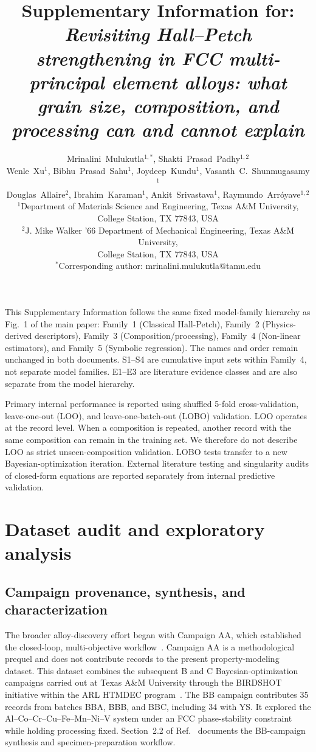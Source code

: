 \documentclass[a4paper,11pt]{article}
\title{Supplementary Information for:\\
\emph{Revisiting Hall--Petch strengthening in FCC multi-principal element alloys: what grain size, composition, and processing can and cannot explain}}
\author{Mrinalini~Mulukutla$^{1,*}$, Shakti~Prasad~Padhy$^{1,2}$ \\ 
Wenle~Xu$^{1}$, Bibhu~Prasad~Sahu$^{1}$, Joydeep~Kundu$^{1}$, Vasanth~C.~Shunmugasamy$^{1}$ \\
Douglas~Allaire$^{2}$, Ibrahim~Karaman$^{1}$, Ankit~Srivastava$^{1}$, Raymundo~Arr\'{o}yave$^{1,2}$\\[0.5em]
\small $^{1}$Department of Materials Science and Engineering, Texas A\&M University,\\
\small College Station, TX 77843, USA\\
\small $^{2}$J. Mike Walker '66 Department of Mechanical Engineering, Texas A\&M University,\\
\small College Station, TX 77843, USA\\
\small $^{*}$Corresponding author: mrinalini.mulukutla@tamu.edu}
\date{}
\newcommand{\familyone}{Classical Hall-Petch}
\newcommand{\familytwo}{Physics-derived descriptors}
\newcommand{\familythree}{Composition\slash processing}
\newcommand{\familyfour}{Non-linear estimators}
\newcommand{\familyfive}{Symbolic regression}
\begin{document}
\maketitle
\begingroup
\sloppy
\tableofcontents
\endgroup

This Supplementary Information follows the same fixed model-family hierarchy as Fig.~1 of the main paper: Family~1 (\familyone), Family~2 (\familytwo), Family~3 (\familythree), Family~4 (\familyfour), and Family~5 (\familyfive). The names and order remain unchanged in both documents. S1--S4 are cumulative input sets within Family~4, not separate model families. E1--E3 are literature evidence classes and are also separate from the model hierarchy.

Primary internal performance is reported using shuffled 5-fold cross-validation, leave-one-out (LOO), and leave-one-batch-out (LOBO) validation. LOO operates at the record level. When a composition is repeated, another record with the same composition can remain in the training set. We therefore do not describe LOO as strict unseen-composition validation. LOBO tests transfer to a new Bayesian-optimization iteration. External literature testing and singularity audits of closed-form equations are reported separately from internal predictive validation.

\section{Dataset audit and exploratory analysis}
\label{si:data}

\subsection{Campaign provenance, synthesis, and characterization}

The broader alloy-discovery effort began with Campaign AA, which established the closed-loop, multi-objective workflow~\cite{Hastings2025FCC}. Campaign AA is a methodological prequel and does not contribute records to the present property-modeling dataset. This dataset combines the subsequent B and C Bayesian-optimization campaigns carried out at Texas A\&M University through the BIRDSHOT initiative within the ARL HTMDEC program~\cite{Mulukutla2024BIRDSHOT,Mulukutla2026BRAVE}. The BB campaign contributes 35 records from batches BBA, BBB, and BBC, including 34 with YS. It explored the Al--Co--Cr--Cu--Fe--Mn--Ni--V system under an FCC phase-stability constraint while holding processing fixed. Section~2.2 of Ref.~\cite{Mulukutla2026BRAVE} documents the BB-campaign synthesis and specimen-preparation workflow.
\end{document}
